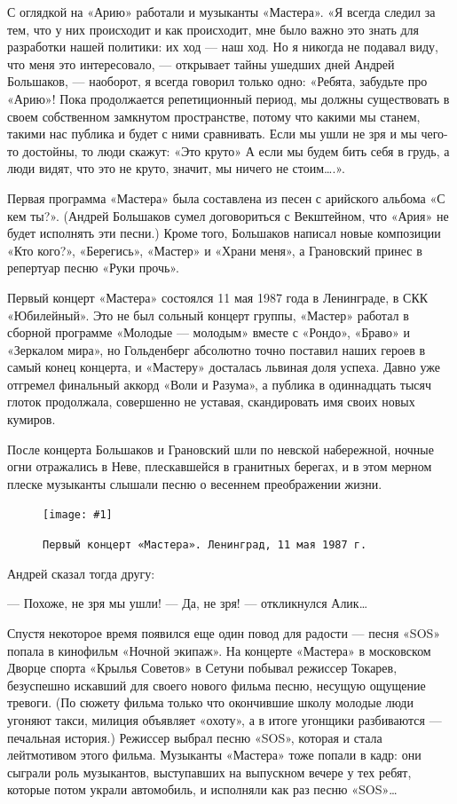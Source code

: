 \documentclass[10pt, twoside]{book}
\newcommand{\myincludegraphics}[1]{\texttt{[image: \#1]}}
\begin{document}
С оглядкой на «Арию» работали и музыканты «Мастера». «Я всегда следил за тем, что у них происходит и как происходит, мне
было важно это знать для разработки нашей политики: их ход — наш ход. Но я никогда не подавал виду, что меня это
интересовало, — открывает тайны ушедших дней Андрей Большаков, — наоборот, я всегда говорил только одно: «Ребята,
забудьте про «Арию»! Пока продолжается репетиционный период, мы должны существовать в своем собственном замкнутом
пространстве, потому что какими мы станем, такими нас публика и будет с ними сравнивать. Если мы ушли не зря и мы
чего-то достойны, то люди скажут: «Это круто» А если мы будем бить себя в грудь, а люди видят, что это не круто, значит,
мы ничего не стоим\ldots.».

Первая программа «Мастера» была составлена из песен с арийского альбома «С кем ты?». (Андрей Большаков сумел
договориться с Векштейном, что «Ария» не будет исполнять эти песни.) Кроме того, Большаков написал новые композиции
«Кто кого?», «Берегись», «Мастер» и «Храни меня», а Грановский принес в репертуар песню «Руки прочь».

Первый концерт «Мастера» состоялся 11 мая 1987 года в Ленинграде, в СКК «Юбилейный». Это не был сольный концерт группы,
«Мастер» работал в сборной программе «Молодые — молодым» вместе с «Рондо», «Браво» и «Зеркалом мира», но Гольденберг
абсолютно точно поставил наших героев в самый конец концерта, и «Мастеру» досталась львиная доля успеха. Давно уже
отгремел финальный аккорд «Воли и Разума», а публика в одиннадцать тысяч глоток продолжала, совершенно не уставая,
скандировать имя своих новых кумиров.

После концерта Большаков и Грановский шли по невской набережной, ночные огни отражались в Неве, плескавшейся в гранитных
берегах, и в этом мерном плеске музыканты слышали песню о весеннем преображении жизни.

\begin{figure}[h]
    \centering
    \myincludegraphics{Image18}
    \caption{\texttt{Первый концерт «Мастера». Ленинград, 11 мая 1987 г.}}
\end{figure}

Андрей сказал тогда другу:

— Похоже, не зря мы ушли!
— Да, не зря! — откликнулся Алик\ldots

Спустя некоторое время появился еще один повод для радости — песня «SOS» попала в кинофильм «Ночной экипаж». На концерте
«Мастера» в московском Дворце спорта «Крылья Советов» в Сетуни побывал режиссер Токарев, безуспешно искавший для своего
нового фильма песню, несущую ощущение тревоги. (По сюжету фильма только что окончившие школу молодые люди угоняют такси,
милиция объявляет «охоту», а в итоге угонщики разбиваются — печальная история.) Режиссер выбрал песню «SOS», которая и
стала лейтмотивом этого фильма. Музыканты «Мастера» тоже попали в кадр: они сыграли роль музыкантов, выступавших на
выпускном вечере у тех ребят, которые потом украли автомобиль, и исполняли как раз песню «SOS»\ldots
\end{document}
